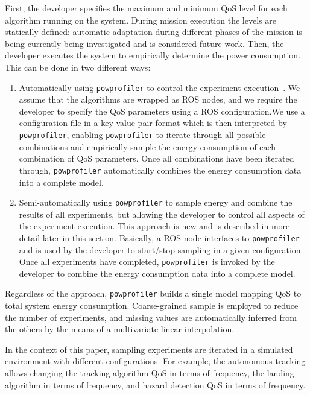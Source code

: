 \documentclass[conference]{IEEEtran}
\newcommand{\stt}[1]{{\small\tt #1}} %
\newcommand{\powprof}{\stt{powprofiler}}
\begin{document}
First, the developer specifies the maximum and minimum QoS level for each algorithm running on the system. 
During mission execution the levels are statically defined: automatic adaptation during different phases of the mission is being currently being investigated and is considered future work. 
%
Then, the developer executes the system to empirically determine the power consumption. This can be done in two different ways:
%
\begin{enumerate}
\item Automatically using \powprof{} to control the experiment execution~\cite{seewald2020mechanical}. 
We assume that the algorithms are wrapped as ROS nodes, and we require the developer to specify the QoS parameters using a ROS configuration.We use a configuration file in a key-value pair format which is then interpreted by \powprof{}, enabling \powprof{} to iterate through all possible combinations and empirically sample the energy consumption of each combination of QoS parameters. Once all combinations have been iterated through, \powprof{} automatically combines the energy consumption data into a complete model.
\item Semi-automatically using \powprof{} to sample energy and combine the results of all experiments, but allowing the developer to control all aspects of the experiment execution. This approach is new and is described in more detail later in this section. Basically, a ROS node interfaces to \powprof{} and is used by the developer to start/stop sampling in a given configuration. Once all experiments have completed, \powprof{} is invoked by the developer to combine the energy consumption data into a complete model.
\end{enumerate}
%
Regardless of the approach, \powprof{} builds a single model mapping QoS to total system energy consumption. Coarse-grained sample is employed to reduce the number of experiments, and missing values are automatically inferred from the others by the means of a multivariate linear interpolation.

In the context of this paper, sampling experiments are iterated in a simulated environment with different configurations. 
For example, the autonomous tracking allows changing the tracking algorithm QoS in terms of frequency, the landing algorithm in terms of frequency, and hazard detection QoS in terms of frequency. %

\end{document}
